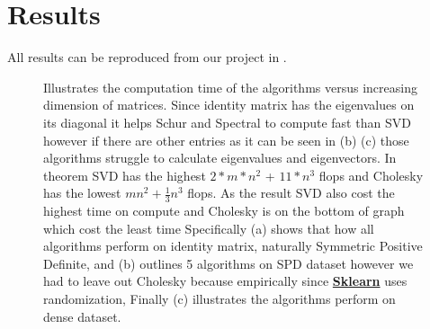 \documentclass[]{finalproject}
\begin{document}
\begin{flushleft}
\clearpage
\end{flushleft}

\section{Results} \label{results}
\begin{flushleft}
All results can be reproduced from our project in \href{https://github.com/uslumt/Efficient_Computational_Algorithms}{}.
\begin{figure}[!h]
\centering     %
{}
\caption{Illustrates the computation time of the algorithms versus increasing dimension of matrices. Since identity matrix has the eigenvalues on its diagonal it helps Schur and Spectral to compute fast than SVD however if there are other entries as it can be seen in (b) (c) those algorithms struggle to calculate eigenvalues and eigenvectors. In theorem SVD has the highest $2*m*n^{2}$ + $11*n^{3}$ flops and Cholesky has the lowest $mn^{2} + \frac{1}{3}n^{3}$ flops.
As the result SVD also cost the highest time on compute and Cholesky is on the bottom of graph which cost the least time Specifically (a) shows that how all algorithms perform on identity matrix, naturally Symmetric Positive Definite, and (b) outlines 5 algorithms on SPD dataset however we had to leave out Cholesky because empirically since \href{https://scikit-learn.org/stable/modules/generated/sklearn.datasets.make_sparse_spd_matrix.html#sklearn.datasets.make_sparse_spd_matrix}{\textbf{Sklearn}} uses randomization, Finally (c) illustrates the algorithms perform on dense dataset. }
\end{figure}



\end{flushleft}
\end{document}
